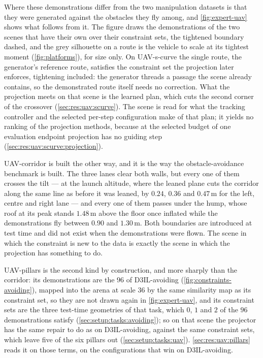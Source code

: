 Where these demonstrations differ from the two manipulation datasets is that they were generated against
the obstacles they fly among, and \autoref{fig:expert-uav} shows what follows from it. The figure draws
the demonstrations of the two scenes that have their own over their constraint sets, the tightened boundary dashed, and the grey silhouette
on a route is the vehicle to scale at its tightest moment (\autoref{fig:platforms}), for size only. On
UAV-s-curve the
single route, the generator's reference route, satisfies the constraint set the projection later enforces,
tightening included: the generator threads a passage the scene already contains, so the demonstrated
route itself needs no correction. What the projection meets on that scene is the learned plan, which cuts
the second corner of the crossover (\autoref{sec:res:uav:scurve}). The scene is read for what the tracking
controller and the selected per-step configuration make of that plan; it yields no ranking of the
projection methods, because at the selected budget of one evaluation endpoint projection has no guiding
step (\autoref{sec:res:uav:scurve:projection}).

UAV-corridor is built the other way, and it is the way the obstacle-avoidance benchmark is built. The three
lanes clear both walls, but every one of them crosses the tilt --- at the launch altitude, where the leaned
plane cuts the corridor along the same line as before it was leaned, by $0.24$, $0.36$ and $0.47$\,m for the
left, centre and right lane --- and every one of them passes under the hump, whose roof at its peak stands
$1.48$\,m above the floor once inflated while the demonstrations fly between $0.90$ and $1.30$\,m. Both
boundaries are introduced at test time and did not exist when the demonstrations were flown. The scene in
which the constraint is new to the data is exactly the scene in which the projection has something to do.

UAV-pillars is the second kind by construction, and more sharply than the corridor: its demonstrations are
the $96$ of D3IL-avoiding (\autoref{fig:constraints-avoiding}), mapped into the arena at scale $36$ by the
same similarity map as its constraint set, so they are not drawn again in \autoref{fig:expert-uav}, and
its constraint sets are the three test-time geometries of
that task, which $0$, $1$ and $2$ of the $96$ demonstrations satisfy (\autoref{sec:setup:tasks:avoiding});
so on that scene the projector has the same repair to do as on D3IL-avoiding, against the same constraint
sets, which leave five of the six pillars out (\autoref{sec:setup:tasks:uav}).
\autoref{sec:res:uav:pillars} reads it on those terms, on the configurations that win on D3IL-avoiding.

